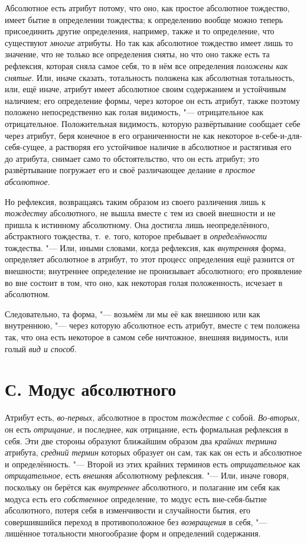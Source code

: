 Абсолютное есть атрибут потому, что оно, как простое абсолютное тождество,
имеет бытие в определении тождества; к определению вообще можно теперь
присоединить другие определения, например, также и то определение, что
существуют {\em многие} атрибуты. Но так как абсолютное
тождество имеет лишь то значение, что не только все определения сняты, но
что оно также есть та рефлексия, которая сняла самое себя, то в нём все
определения {\em положены как снятые}. Или, иначе
сказать, тотальность положена как абсолютная тотальность, или, ещё иначе,
атрибут имеет абсолютное своим содержанием и устойчивым наличием; его
определение формы, через которое он есть атрибут, также поэтому положено
непосредственно как голая видимость, "--- отрицательное как отрицательное.
Положительная видимость, которую развёртывание сообщает себе через атрибут,
беря конечное в его ограниченности не как некоторое
в-себе-и-для-себя-сущее, а растворяя его устойчивое наличие в абсолютное и
растягивая его до атрибута, снимает само то обстоятельство, что он есть
атрибут; это развёртывание погружает его и своё различающее делание
{\em в простое абсолютное}.

Но рефлексия, возвращаясь таким образом из своего различения лишь к
{\em тождеству} абсолютного, не вышла вместе с тем из
своей внешности и не пришла к истинному абсолютному. Она достигла лишь
неопределённого, абстрактного тождества, т.~е. того, которое пребывает в
{\em определённости} тождества. "--- Или, иными словами,
когда рефлексия, как {\em внутренняя} форма, определяет
абсолютное в атрибут, то этот процесс определения ещё разнится от
внешности; внутреннее определение не пронизывает абсолютного; его
проявление во вне состоит в том, что оно, как некоторая голая положенность,
исчезает в абсолютном.

Следовательно, та форма, "--- возьмём ли мы её как внешнюю или как внутреннюю,
"--- через которую абсолютное есть атрибут, вместе с тем положена так, что она
есть некоторое в самом себе ничтожное, внешняя видимость, или голый
{\em вид и способ}.


\section[С. Модус абсолютного]{С. Модус абсолютного}

Атрибут есть, {\em во-первых,} абсолютное в простом {\em тождестве} с собой.
{\em Во-вторых,} он есть {\em отрицание,} и последнее,
{\em как} отрицание, есть формальная рефлексия в себя.
Эти две стороны образуют ближайшим образом два {\em крайних термина} атрибута,
{\em средний термин} которых образует он сам, так как
он есть и абсолютное и определённость. "--- Второй из этих крайних терминов
есть {\em отрицательное} как {\em отрицательное,} есть
{\em внешняя} абсолютному рефлексия. "--- Или, иначе
говоря, поскольку он берётся как {\em внутреннее}
абсолютного, и полагание им себя как модуса есть его
{\em собственное} определение, то модус есть
вне-себя-бытие абсолютного, потеря себя в изменчивости и случайности бытия,
его совершившийся переход в противоположное без
{\em возвращения} в себя, "--- лишённое тотальности
многообразие форм и определений содержания.

